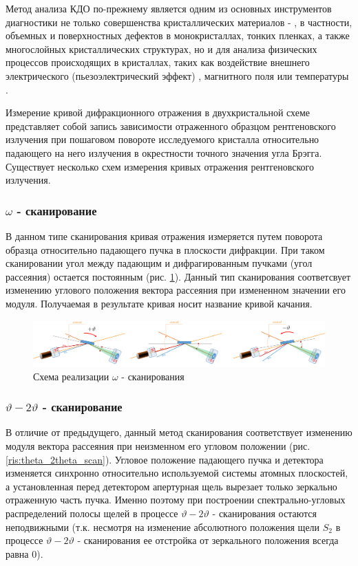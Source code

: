 Метод анализа КДО по-прежнему является одним из основных инструментов диагностики не только совершенства
кристаллических материалов \cite{sov_1} - \cite{sov_5}, в частности, объемных и поверхностных дефектов в
монокристаллах, тонких пленках, а также многослойных кристаллических структурах, но и для анализа физических
процессов происходящих в кристаллах, таких как воздействие внешнего электрического (пьезоэлектрический эффект) \cite{piezo102},
магнитного поля или температуры \cite{temp}.

Измерение кривой дифракционного отражения в двухкристальной схеме представляет
собой запись зависимости отраженного образцом рентгеновского излучения при
пошаговом повороте исследуемого кристалла относительно падающего на него
излучения в окрестности точного значения угла Брэгга.
Существует несколько схем измерения кривых отражения рентгеновского излучения.

\subsubsection*{$\omega$ - сканирование}
В данном типе сканирования кривая отражения измеряется путем поворота образца
относительно падающего пучка в плоскости дифракции. При таком сканировании
угол между падающим и дифрагированным пучками (угол рассеяния) остается постоянным
(рис. \ref{ris:omega_scan}). Данный тип сканирования соответсвует
изменению углового положения вектора рассеяния при измененном значении его модуля.
 Получаемая в результате кривая носит название кривой качания.


\begin{figure}[H]
  \centering
  \includegraphics[width=1\textwidth]{images/omega_scan.png}
  \caption{Схема реализации $\omega $ - сканирования}
  \label{ris:omega_scan}
\end{figure}

\subsubsection*{$\vartheta - 2\vartheta$ - сканирование}
В отличие от предыдущего, данный метод сканирования соответствует изменению
 модуля вектора рассеяния при неизменном его угловом положении
 (рис. \ref{ris:theta_2theta_scan}). Угловое положение падающего пучка и
 детектора изменяется синхронно относительно используемой системы
 атомных плоскостей, а установленная перед детектором апертурная щель вырезает
  только зеркально отраженную часть пучка. Именно поэтому при построении
  спектрально-угловых распределений полосы щелей в процессе $\vartheta - 2\vartheta$
  - сканирования остаются неподвижными (т.к. несмотря на изменение абсолютного положения щели  $S_2$ в процессе
    $\vartheta - 2\vartheta$ -  сканирования ее отстройка от зеркального
    положения всегда равна 0).

